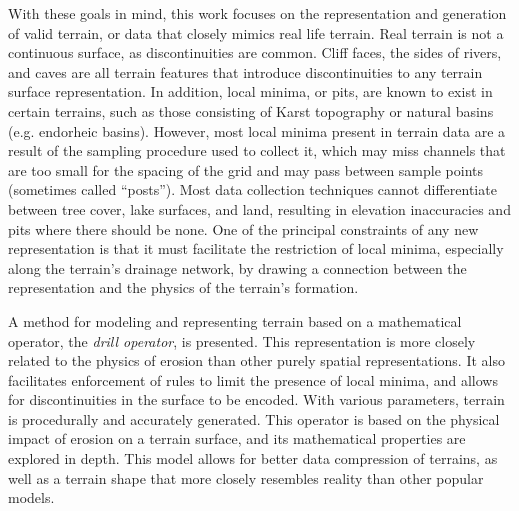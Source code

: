 With these goals in mind, this work focuses on the representation and generation of valid terrain, or data that 
closely mimics real life terrain. Real terrain is not a continuous surface, as discontinuities are common. Cliff faces, the sides of rivers, and caves are all terrain features that introduce discontinuities to any terrain surface representation. 
In addition, local minima, or pits, are known to exist in certain terrains, such as those consisting of Karst topography or natural basins (e.g. endorheic basins). 
However, most
local minima present in terrain data are a result of the sampling procedure used to collect it, which may miss channels
that are too small for the spacing of the grid and may
pass between sample points (sometimes called ``posts''). 
Most data collection techniques cannot differentiate between tree cover, lake surfaces, and land, resulting in elevation inaccuracies and pits where there should be none.
One of the principal constraints of any new representation is that it must facilitate the restriction of local minima, especially along the terrain's drainage network, by drawing a connection between the representation and the physics of the terrain's formation.

A method for modeling and representing terrain based on a mathematical operator, the \emph{drill operator}, is presented. This representation is more closely related to the physics of erosion than other purely spatial representations. It also facilitates enforcement of rules to limit the presence of local minima, and allows for discontinuities in the surface to be encoded. 
 With various parameters, terrain is procedurally and accurately generated. This operator is based on the physical impact of erosion on a terrain surface, and its mathematical properties are explored in depth. 
This model allows for better data compression of terrains, as well as a terrain shape that more closely resembles reality than other popular models.

